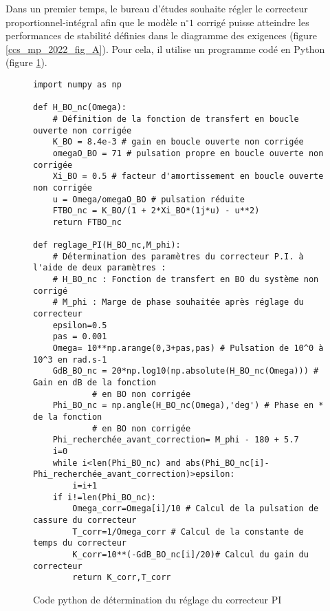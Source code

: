 
Dans un premier temps, le bureau d'études souhaite régler le correcteur proportionnel-intégral afin que le modèle $\mathrm{n}^{\circ} 1$ corrigé puisse atteindre les performances de stabilité définies dans le diagramme des exigences (figure \ref{ccs_mp_2022_fig_A}). Pour cela, il utilise un programme codé en Python (figure \ref{ccs_mp_2022_fig_10}).
\begin{figure}
\centering
\begin{lstlisting}
import numpy as np

def H_BO_nc(Omega):
    # Définition de la fonction de transfert en boucle ouverte non corrigée
    K_BO = 8.4e-3 # gain en boucle ouverte non corrigée
    omegaO_BO = 71 # pulsation propre en boucle ouverte non corrigée
    Xi_BO = 0.5 # facteur d'amortissement en boucle ouverte non corrigée
    u = Omega/omegaO_BO # pulsation réduite
    FTBO_nc = K_BO/(1 + 2*Xi_BO*(1j*u) - u**2)
    return FTBO_nc
    
def reglage_PI(H_BO_nc,M_phi):
    # Détermination des paramètres du correcteur P.I. à l'aide de deux paramètres :
    # H_BO_nc : Fonction de transfert en BO du système non corrigé
    # M_phi : Marge de phase souhaitée après réglage du correcteur
    epsilon=0.5
    pas = 0.001
    Omega= 10**np.arange(0,3+pas,pas) # Pulsation de 10^0 à 10^3 en rad.s-1
    GdB_BO_nc = 20*np.log10(np.absolute(H_BO_nc(Omega))) # Gain en dB de la fonction
            # en BO non corrigée
    Phi_BO_nc = np.angle(H_BO_nc(Omega),'deg') # Phase en * de la fonction
            # en BO non corrigée
    Phi_recherchée_avant_correction= M_phi - 180 + 5.7
    i=0
    while i<len(Phi_BO_nc) and abs(Phi_BO_nc[i]-Phi_recherchée_avant_correction)>epsilon:
        i=i+1
    if i!=len(Phi_BO_nc):
        Omega_corr=Omega[i]/10 # Calcul de la pulsation de cassure du correcteur
        T_corr=1/Omega_corr # Calcul de la constante de temps du correcteur
        K_corr=10**(-GdB_BO_nc[i]/20)# Calcul du gain du correcteur
        return K_corr,T_corr
\end{lstlisting}

\caption{\label{ccs_mp_2022_fig_10}Code python de détermination du réglage du correcteur PI}
\end{figure}

